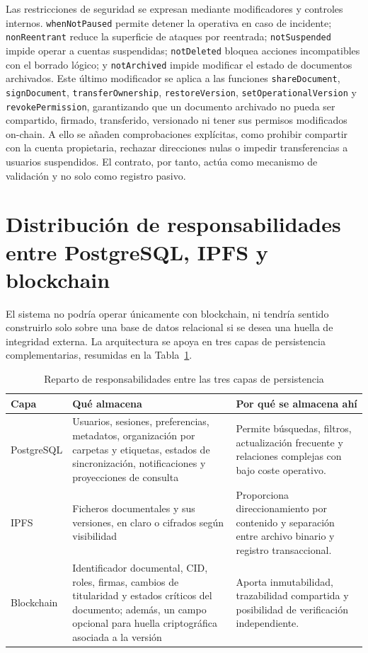 \documentclass[11pt, a4paper]{article}
\begin{document}
Las restricciones de seguridad se expresan mediante modificadores y controles internos. \texttt{whenNotPaused} permite detener la operativa en caso de incidente; \texttt{nonReentrant} reduce la superficie de ataques por reentrada; \texttt{notSuspended} impide operar a cuentas suspendidas; \texttt{notDeleted} bloquea acciones incompatibles con el borrado lógico; y \texttt{notArchived} impide modificar el estado de documentos archivados. Este último modificador se aplica a las funciones \texttt{shareDocument}, \texttt{signDocument}, \texttt{transferOwnership}, \texttt{restoreVersion}, \texttt{setOperationalVersion} y \texttt{revokePermission}, garantizando que un documento archivado no pueda ser compartido, firmado, transferido, versionado ni tener sus permisos modificados on-chain. A ello se añaden comprobaciones explícitas, como prohibir compartir con la cuenta propietaria, rechazar direcciones nulas o impedir transferencias a usuarios suspendidos. El contrato, por tanto, actúa como mecanismo de validación y no solo como registro pasivo.

\section{Distribución de responsabilidades entre PostgreSQL, IPFS y blockchain}

El sistema no podría operar únicamente con blockchain, ni tendría sentido construirlo solo sobre una base de datos relacional si se desea una huella de integridad externa. La arquitectura se apoya en tres capas de persistencia complementarias, resumidas en la Tabla~\ref{tab:capas-persistencia-anexo6}.

\begin{table}[H]
    \centering
    \small
    \begin{tabular}{|p{3.1cm}|p{5.1cm}|p{6.1cm}|}
    \hline
    \textbf{Capa} & \textbf{Qué almacena} & \textbf{Por qué se almacena ahí} \\
    \hline
    PostgreSQL & Usuarios, sesiones, preferencias, metadatos, organización por carpetas y etiquetas, estados de sincronización, notificaciones y proyecciones de consulta & Permite búsquedas, filtros, actualización frecuente y relaciones complejas con bajo coste operativo. \\
    \hline
    IPFS & Ficheros documentales y sus versiones, en claro o cifrados según visibilidad & Proporciona direccionamiento por contenido y separación entre archivo binario y registro transaccional. \\
    \hline
    Blockchain & Identificador documental, CID, roles, firmas, cambios de titularidad y estados críticos del documento; además, un campo opcional para huella criptográfica asociada a la versión & Aporta inmutabilidad, trazabilidad compartida y posibilidad de verificación independiente. \\
    \hline
    \end{tabular}
    \caption{Reparto de responsabilidades entre las tres capas de persistencia}
    \label{tab:capas-persistencia-anexo6}
\end{table}
\end{document}
